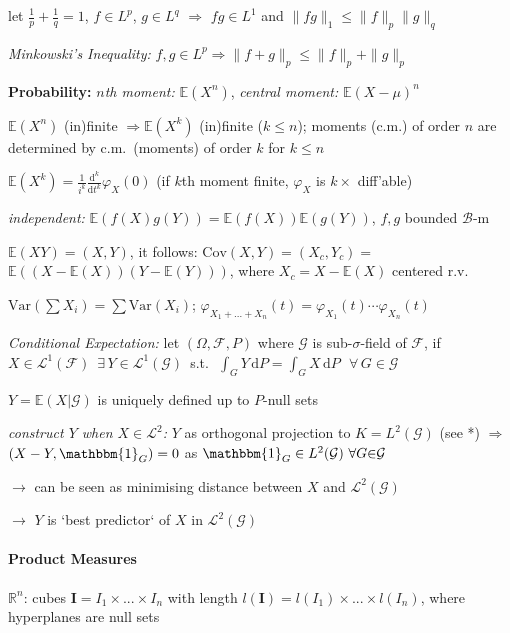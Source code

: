 \documentclass[8pt,twoside]{extarticle}
\begin{document}
\begin{multicols}{2}
let $\frac{1}{p}+\frac{1}{q}=1$, $f\in L^p$, $g\in L^q$ $\Rightarrow$ $fg\in L^1$ and $\|fg\|_1\leq \|f\|_p\|g\|_q$

\textit{Minkowski's Inequality:} $f,g\in L^p \Rightarrow \|f{+}g\|_p\leq \|f\|_p+\|g\|_p$

\textbf{Probability:}
\textit{$n$th moment:} $\mathbb{E}(X^n)$, \textit{central moment:} $\mathbb{E}(X-\mu)^n$

 $\mathbb{E}(X^n)$ (in)finite $\Rightarrow \mathbb{E}(X^k)$ (in)finite ($k\leq n$); 
  moments (c.m.) of order $n$ are determined by c.m.\ (moments) of order $k$ for $k\leq n$

$\mathbb{E}(X^k)=\frac{1}{i^k}\frac{\mathrm{d}^k}{\mathrm{d}t^k}\varphi_X(0)$ (if $k$th moment finite, $\varphi_X$ is $k\times$  diff'able)

\textit{independent:} $\mathbb{E}(f(X)g(Y))=\mathbb{E}(f(X))\mathbb{E}(g(Y))$, $f,g$ bounded $\mathcal{B}$-m

$\mathbb{E}(XY)=(X,Y)$, it follows: $\mathrm{Cov}(X,Y)=(X_c,Y_c)=$ $\mathbb{E}\left((X-\mathbb{E}(X))(Y-\mathbb{E}(Y))\right)$, where $X_c = X-\mathbb{E}(X)$ centered r.v.\

$\mathrm{Var}(\sum X_i)=\sum\mathrm{Var}(X_i)$; $\varphi_{X_1+...+X_n}(t)=\varphi_{X_1}(t)\cdots \varphi_{X_n}(t)$

\textit{Conditional Expectation:} let $(\Omega, \mathcal{F}, P)$ where $\mathcal{G}$ is sub-$\sigma$-field of $\mathcal{F}$, if $X{\in} \mathcal{L}^1(\mathcal{F}) \,\,\, \exists \, Y{\in} \mathcal{L}^1(\mathcal{G})\,$ s.t.\ $\,\int_G Y\,\mathrm{d}P =  \int_G X\,\mathrm{d}P \,\,\,\, \forall\, G{\in} \mathcal{G}$

$Y=\mathbb{E}(X|\mathcal{G})$ is uniquely defined up to $P$-null sets

\textit{construct $Y$ when $X\in \mathcal{L}^2$:} $Y$ as orthogonal projection to $K=L^2(\mathcal{G})$ (see *) $\Rightarrow$ $(X-Y,\mathbbm{1}_G)=0$ as $\mathbbm{1}_G\in L^2(\mathcal{G}) \,\,\forall G{\in}\mathcal{G}$

$\to$ can be seen as minimising distance between $X$ and $\mathcal{L}^2(\mathcal{G})$

$\to$ $Y$ is `best predictor` of $X$ in $\mathcal{L}^2(\mathcal{G})$


\paragraph{Product Measures} $\mathbb{R}^n$: cubes $\boldsymbol{I}=I_1 \times ... \times I_n$ with length $l(\boldsymbol{I})=l(I_1) \times ... \times l(I_n)$, where hyperplanes are null sets


\end{multicols}
\end{document}
